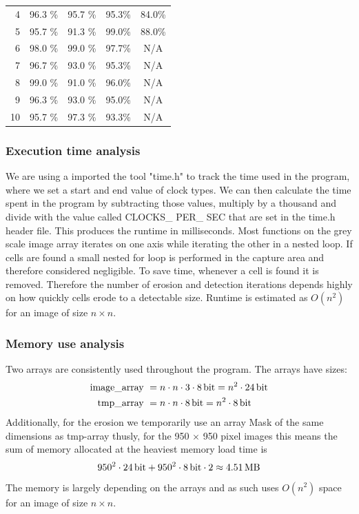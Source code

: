 \documentclass[a4paper, english]{article}
\numberwithin{equation}{section}
\begin{document}
\begin{table}[H]
\begin{subtable}[t]{.49\textwidth}
\begin{tabular}{rcccc}
        4  & 96.3 \% & 95.7 \% & 95.3\% & 84.0\%   \\
        5  & 95.7 \% & 91.3 \% & 99.0\% & 88.0\%   \\
        6  & 98.0 \% & 99.0 \% & 97.7\% & N/A        \\
        7  & 96.7 \% & 93.0 \% & 95.3\% & N/A        \\
        8  & 99.0 \% & 91.0 \% & 96.0\% & N/A        \\
        9  & 96.3 \% & 93.0 \% & 95.0\% & N/A        \\
        10 & 95.7 \% & 97.3 \% & 93.3\% & N/A        \\
    \end{tabular}
    \end{subtable}
    \end{table}
\subsubsection{Execution time analysis}
We are using a imported the tool "time.h" to track the time used in the program, where we set a start and end value of clock types. We can then calculate the time spent in the program by subtracting those values, multiply by a thousand and divide with the value called CLOCKS\_ PER\_ SEC that are set in the time.h header file. This produces the runtime in milliseconds.\newline
Most functions on the grey scale image array iterates on one axis while iterating the other in a nested loop. If cells are found a small nested for loop is performed in the capture area and therefore considered negligible. To save time, whenever a cell is found it is removed. Therefore the number of erosion and detection iterations depends highly on how quickly cells erode to a detectable size.
Runtime is estimated as \(O(n^2)\) for an image of size \(n\times n\).
\subsubsection{Memory use analysis}\label{sec:mem}
Two arrays are consistently used throughout the program. The arrays have sizes:
\begin{align}
    \text{image\_array} \  & = n \cdot n \cdot 3 \cdot \SI{8}{\bit} = n^2 \cdot \SI{24}{\bit} \\
    \text{tmp\_array} \    & = n \cdot n \cdot \SI{8}{\bit} = n^2 \cdot \SI{8}{\bit}
\end{align}
Additionally, for the erosion we temporarily use an array Mask of the same dimensions as tmp-array thusly,
for the 950 \(\times\) 950 pixel images this means the sum of memory allocated at the heaviest memory load time is
\begin{align}
    950^2 \cdot \SI{24}{\bit} + 950^2 \cdot \SI{8}{\bit} \cdot 2  \approx \SI{4.51}{\mega\byte}
\end{align}
The memory is largely depending on the arrays and as such uses \(O(n^2)\) space for an image of size \(n\times n\).
\end{document}
